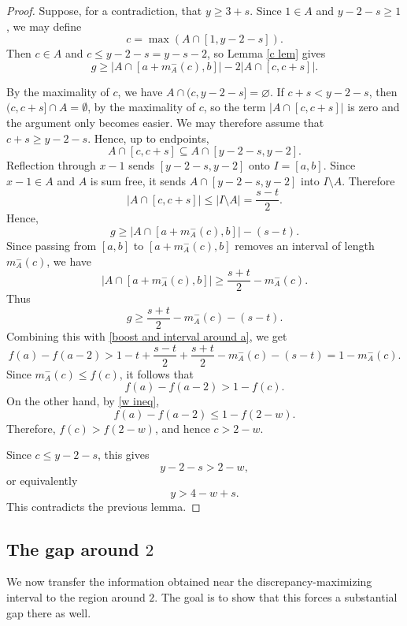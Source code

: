 \documentclass[11pt,reqno]{amsart}
\theoremstyle{definition}
\def\F#1{f(#1)}
\begin{document}
\begin{proof}
Suppose, for a contradiction, that $y\geq 3+s$. Since $1\in A$ and
    $y-2-s\geq1$, we may define
    $$
        c=\max(A\cap[1,y-2-s]).
    $$
    Then $c\in A$ and $c\leq y-2-s=y-s-2$, so Lemma \ref{c lem} gives
    $$
        g\geq |A\cap[a+m_A^-(c),b]|-2|A\cap[c,c+s]|.
    $$

    By the maximality of $c$, we have $A\cap(c,y-2-s]=\varnothing$.
If $c+s<y-2-s$, then $(c,c+s]\cap A=\emptyset$, by the maximality of $c$, so the
term $|A\cap[c,c+s]|$ is zero and the argument only becomes easier. We may
therefore assume that $c+s\geq y-2-s$. Hence, up to endpoints,
$$
    A\cap[c,c+s]\subseteq A\cap[y-2-s,y-2].
$$
    Reflection through $x-1$ sends $[y-2-s,y-2]$ onto $I=[a,b]$. Since
    $x-1\in A$ and $A$ is sum free, it sends $A\cap[y-2-s,y-2]$ into
    $I\setminus A$. Therefore
    $$
        |A\cap[c,c+s]|\leq |I\setminus A|=\frac{s-t}{2}.
    $$
    Hence,  
    $$
        g\geq |A\cap[a+m_A^-(c),b]|-(s-t).
    $$
    Since passing from $[a,b]$ to $[a+m_A^-(c),b]$ removes an interval of
    length $m_A^-(c)$, we have
    $$
        |A\cap[a+m_A^-(c),b]|
        \geq
        \frac{s+t}{2}-m_A^-(c).
    $$
    Thus
    $$
        g\geq \frac{s+t}{2}-m_A^-(c)-(s-t).
    $$
 Combining this with \eqref{boost and interval around a}, we get
    $$
        \F{a}-\F{a-2}
        >
        1-t+\frac{s-t}{2}
        +\frac{s+t}{2}
        -m_A^-(c)
        -(s-t)
        =
        1-m_A^-(c).
    $$
    Since $m_A^-(c)\leq \F{c}$, it follows that
    $$
        \F{a}-\F{a-2}>1-\F{c}.
    $$
    On the other hand, by \eqref{w ineq},
    $$
        \F{a}-\F{a-2}\leq 1-\F{2-w}.
    $$
    Therefore,   $\F{c}>\F{2-w}$, and hence $c>2-w$.

    Since $c\leq y-2-s$, this gives
    $$
        y-2-s>2-w,
    $$
    or equivalently
    $$
        y>4-w+s.
    $$
    This contradicts the previous lemma.
\end{proof}
\subsection{The gap around $2$}

We now transfer the information obtained near the discrepancy-maximizing interval to the region around $2$. The goal is to show that this forces a substantial gap there as well.
\end{document}
